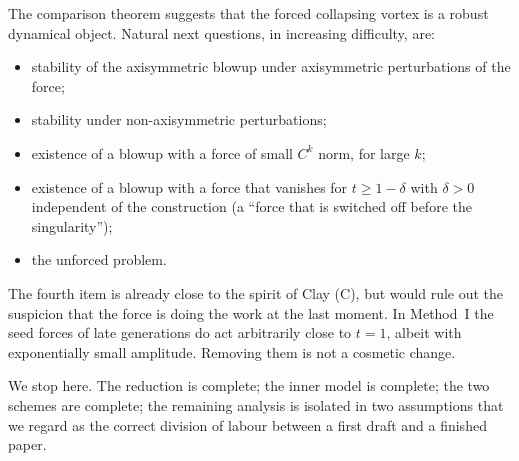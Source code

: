 The comparison theorem suggests that the forced collapsing vortex is a robust dynamical object. Natural next questions, in increasing difficulty, are:
\begin{itemize}[leftmargin=1.2em]
\item stability of the axisymmetric blowup under axisymmetric perturbations of the force;
\item stability under non-axisymmetric perturbations;
\item existence of a blowup with a force of small $C^k$ norm, for large $k$;
\item existence of a blowup with a force that vanishes for $t\ge 1-\delta$ with $\delta>0$ independent of the construction (a ``force that is switched off before the singularity'');
\item the unforced problem.
\end{itemize}
The fourth item is already close to the spirit of {C}lay (C), but would rule out the suspicion that the force is doing the work at the last moment. In Method~I the seed forces of late generations do act arbitrarily close to $t=1$, albeit with exponentially small amplitude. Removing them is not a cosmetic change.

We stop here. The reduction is complete; the inner model is complete; the two schemes are complete; the remaining analysis is isolated in two assumptions that we regard as the correct division of labour between a first draft and a finished paper.
